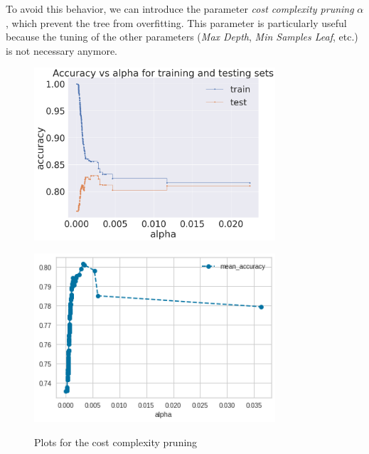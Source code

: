\documentclass[a4paper,11pt,dvipsnames]{article}
\begin{document}
To avoid this behavior, we can introduce the parameter \textit{cost complexity pruning} $\alpha$, which prevent the tree from overfitting. This parameter is particularly useful because the tuning of the other parameters (\textit{Max Depth}, \textit{Min Samples Leaf}, etc.) is not necessary anymore.

\begin{figure}[h]
\begin{minipage}{0.5\linewidth}
        \centering
    \includegraphics[width=0.8\textwidth]{accuracy_vs_alpha.png}
    \label{fig:alpha_accuracy}
\end{minipage}
\hfill
    \begin{minipage}{0.5\linewidth}
        \centering
    \includegraphics[width=0.8\textwidth]{mean_accuracy.png}
    \label{fig:mean_accuracy}
\end{minipage}
    \caption{Plots for the cost complexity pruning}
\end{figure}
\end{document}
